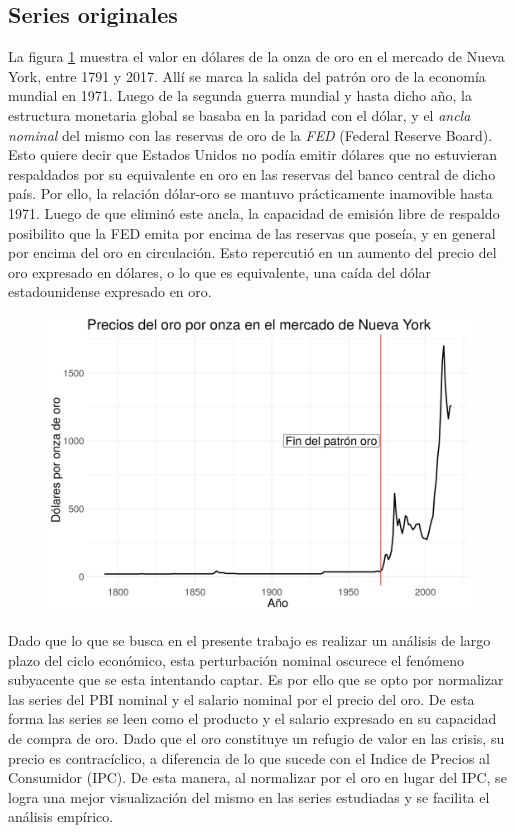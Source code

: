 \documentclass[a4paper]{article}
\begin{document}
\subsection{Series originales}

La figura \ref{fig:oro} muestra el valor en dólares de la onza de oro en el mercado de Nueva York, entre 1791 y 2017. Allí se marca la salida del patrón oro de la economía mundial en 1971. Luego de la segunda guerra mundial y hasta dicho año, la estructura monetaria global se basaba en la paridad con el dólar, y el \textit{ancla nominal} del mismo con las reservas de oro de la \textit{FED} (Federal Reserve Board). Esto quiere decir que Estados Unidos no podía emitir dólares que no estuvieran respaldados por su equivalente en oro en las reservas del banco central de dicho país. Por ello, la relación dólar-oro se mantuvo prácticamente inamovible hasta 1971. Luego de que eliminó este ancla, la capacidad de emisión libre de respaldo posibilito que la FED emita por encima de las reservas que poseía, y en general por encima del oro en circulación. Esto repercutió en un aumento del precio del oro expresado en dólares, o lo que es equivalente, una caída del dólar estadounidense expresado en oro.

\begin{figure}[H]
	\centering
	\includegraphics[width=0.75\linewidth]{oro.png}
	 \caption{}\label{fig:oro}
\end{figure}

Dado que lo que se busca en el presente trabajo es realizar un análisis de largo plazo del ciclo económico, esta perturbación nominal oscurece el fenómeno subyacente que se esta intentando captar. Es por ello que se opto por normalizar las series del PBI nominal y el salario nominal por el precio del oro. De esta forma las series se leen como el producto y el salario expresado en su capacidad de compra de oro.
Dado que el oro constituye un refugio de valor en las crisis, su precio es contracíclico, a diferencia de lo que sucede con el Indice de Precios al Consumidor (IPC). De esta manera, al normalizar por el oro en lugar del IPC, se logra una mejor visualización del mismo en las series estudiadas y se facilita el análisis empírico.
\end{document}
